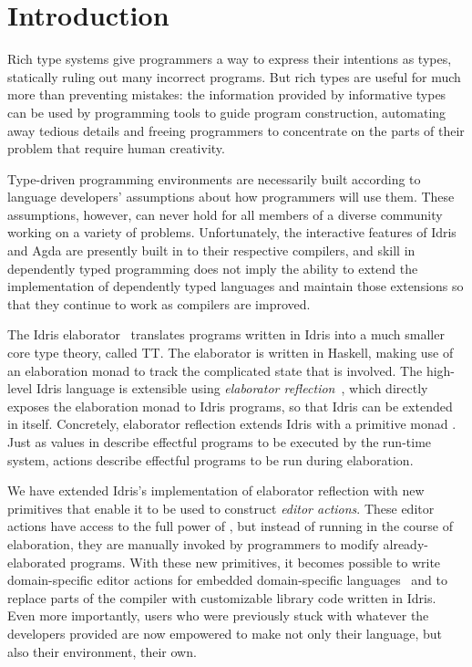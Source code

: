\section{Introduction} \label{sec:introduction}

Rich type systems give programmers a way to express their intentions
as types, statically ruling out many incorrect programs. But rich
types are useful for much more than preventing mistakes: the
information provided by informative types can be used by programming
tools to guide program construction, automating away tedious details
and freeing programmers to concentrate on the parts of their
problem that require human creativity.

Type-driven programming environments are necessarily built according
to language developers' assumptions about how programmers will use
them. These assumptions, however, can never hold for all members of a
diverse community working on a variety of problems. Unfortunately, the
interactive features of Idris and Agda are presently built in to their
respective compilers, and skill in dependently typed programming does
not imply the ability to extend the implementation of dependently
typed languages and maintain those extensions so that they continue to
work as compilers are improved.

The Idris elaborator~\citep{idris} translates programs written in
Idris into a much smaller core type theory, called \textsf{TT}.
The elaborator is written
in Haskell, making use of an elaboration monad to track the
complicated state that is involved. The high-level Idris language is
extensible using \emph{elaborator reflection}~\citep{davidphd,
  elabref}, which directly exposes the elaboration monad to Idris
programs, so that Idris can be extended in itself. Concretely,
elaborator reflection extends Idris with a primitive monad
\Elab{}. Just as values in \IO{} describe effectful programs to be
executed by the run-time system, \Elab{} actions describe effectful
programs to be run during elaboration.

We have extended Idris's implementation of elaborator reflection with
new primitives that enable it to be used to construct \emph{editor
  actions}. These editor actions have access to the full power of
\Elab{}, but instead of running in the course of elaboration, they are
manually invoked by programmers to modify already-elaborated programs.
With these new primitives, it becomes possible to write
domain-specific editor actions for embedded domain-specific
languages~\citep{dsel} and to replace parts of the compiler with
customizable library code written in Idris. Even more importantly,
users who were previously stuck with whatever the developers provided
are now empowered to make not only their language, but also their
environment, their own.

